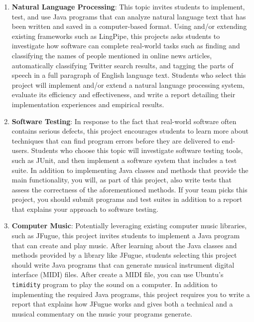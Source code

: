 \begin{enumerate}
  \item {\bf Natural Language Processing}: This topic invites students to implement, test, and use Java programs that
    can analyze natural language text that has been written and saved in a computer-based format.  Using and/or
    extending existing frameworks such as LingPipe, this projects asks students to investigate how software can complete
    real-world tasks such as finding and classifying the names of people mentioned in online news articles,
    automatically classifying Twitter search results, and tagging the parts of speech in a full paragraph of English
    language text. Students who select this project will implement and/or extend a natural language processing system,
    evaluate its efficiency and effectiveness, and write a report detailing their implementation experiences and
    empirical results.

  \item {\bf Software Testing}: In response to the fact that real-world software often contains serious defects, this
    project encourages students to learn more about techniques that can find program errors before they are delivered to
    end-users. Students who choose this topic will investigate software testing tools, such as JUnit, and then implement
    a software system that includes a test suite. In addition to implementing Java classes and methods that provide the
    main functionality, you will, as part of this project, also write tests that assess the correctness of the 
    aforementioned methods. If your team picks this project, you should submit programs and test suites in
    addition to a report that explains your approach to software testing.

  \item {\bf Computer Music}: Potentially leveraging existing computer music libraries, such as JFugue, this project
    invites students to implement a Java program that can create and play music. After learning about the Java classes
    and methods provided by a library like JFugue, students selecting this project should write Java programs that can
    generate musical instrument digital interface (MIDI) files. After create a MIDI file, you can use Ubuntu's {\tt
      timidity} program to play the sound on a computer. In addition to implementing the required Java programs, this
    project requires you to write a report that explains how JFugue works and gives both a technical and a musical
    commentary on the music your programs generate. 


\end{enumerate} 

